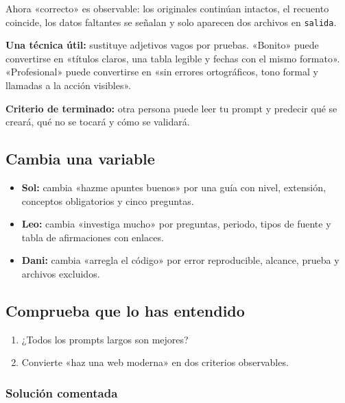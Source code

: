 \documentclass[10pt,a4paper,openany]{book}
\providecommand{\tightlist}{\setlength{\itemsep}{0.18em}\setlength{\parskip}{0pt}}
\begin{document}
Ahora «correcto» es observable: los originales continúan intactos, el
recuento coincide, los datos faltantes se señalan y solo aparecen dos
archivos en \texttt{salida}.

\textbf{Una técnica útil:} sustituye adjetivos vagos por pruebas.
«Bonito» puede convertirse en «títulos claros, una tabla legible y
fechas con el mismo formato». «Profesional» puede convertirse en «sin
errores ortográficos, tono formal y llamadas a la acción visibles».

\begin{successbox}

\textbf{Criterio de terminado:} otra persona puede leer tu prompt y
predecir qué se creará, qué no se tocará y cómo se validará.

\end{successbox}

\subsection{Cambia una variable}\label{cambia-una-variable-4}

\begin{itemize}
\tightlist
\item
  \textbf{Sol:} cambia «hazme apuntes buenos» por una guía con nivel,
  extensión, conceptos obligatorios y cinco preguntas.
\item
  \textbf{Leo:} cambia «investiga mucho» por preguntas, periodo, tipos
  de fuente y tabla de afirmaciones con enlaces.
\item
  \textbf{Dani:} cambia «arregla el código» por error reproducible,
  alcance, prueba y archivos excluidos.
\end{itemize}

\subsection{Comprueba que lo has
entendido}\label{comprueba-que-lo-has-entendido-4}

\begin{enumerate}
\def\labelenumi{\arabic{enumi}.}
\tightlist
\item
  ¿Todos los prompts largos son mejores?
\item
  Convierte «haz una web moderna» en dos criterios observables.
\end{enumerate}

\subsubsection{Solución comentada}\label{soluciuxf3n-comentada-5}
\end{document}
